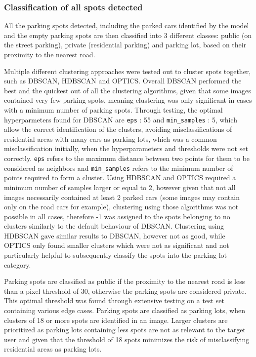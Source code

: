 \newpage

\subsubsection{Classification of all spots detected}
All the parking spots detected, including the parked cars identified by the model and the empty parking spots are then classified into 3 different classes: public (on the street parking), private (residential parking) and parking lot, based on their proximity to the nearest road.

Multiple different clustering approaches were tested out to cluster spots together, such as DBSCAN, HDBSCAN and OPTICS.
Overall DBSCAN performed the best and the quickest out of all the clustering algorithms, given that some images contained very few parking spots, meaning clustering was only significant in cases with a minimum number of parking spots.
Through testing, the optimal hyperparmeters found for DBSCAN are \texttt{eps} : 55 and \texttt{min\_samples} : 5, which allow the correct identification of the clusters, avoiding misclassifications of residential areas with many cars as parking lots, which was a common misclassification initially, when the hyperparameters and thresholds were not set correctly.
\texttt{eps} refers to the maximum distance between two points for them to be considered as neighbors and \texttt{min\_samples} refers to the minimum number of points required to form a cluster.
Using HDBSCAN and OPTICS required a minimum number of samples larger or equal to 2, however given that not all images necessarily contained at least 2 parked cars (some images may contain only on the road cars for example), clustering using those algorithms was not possible in all cases, therefore -1 was assigned to the spots belonging to no clusters similarly to the default behaviour of DBSCAN.
Clustering using HDBSCAN gave similar results to DBSCAN, however not as good, while OPTICS only found smaller clusters which were not as significant and not particularly helpful to subsequently classify the spots into the parking lot category.

Parking spots are classified as public if the proximity to the nearest road is less than a pixel threshold of 30, otherwise the parking spots are considered private. This optimal threshold was found through extensive testing on a test set containing various edge cases.
Parking spots are classified as parking lots, when clusters of 18 or more spots are identified in an image. Larger clusters are prioritized as parking lots containing less spots are not as relevant to the target user and given that the threshold of 18 spots minimizes the risk of misclassifying residential areas as parking lots.


